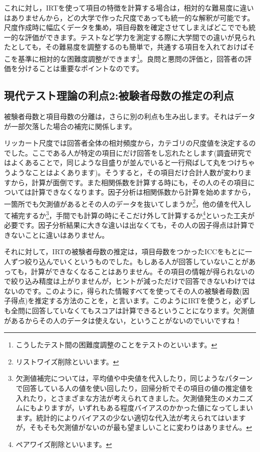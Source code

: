 \documentclass{ltjsbook}
\begin{document}
これに対し，IRTを使って項目の特徴を計算する場合は，相対的な難易度に違いはありませんから，どの大学で作った尺度であっても統一的な解釈が可能です。尺度作成時に幅広くデータを集め，項目母数を確定させてしまえばどこででも統一的な評価ができます。テストなど学力を測定する際に大学間での違いが見られたとしても，その難易度を調整するのも簡単で，共通する項目を入れておけばそこを基準に相対的な困難度調整ができます\footnote{こうしたテスト間の困難度調整のことをテストのといいます。}。良問と悪問の評価と，回答者の評価を分けることは重要なポイントなのです。
\subsection{現代テスト理論の利点2:被験者母数の推定の利点}
被験者母数と項目母数の分離は，さらに別の利点も生み出します。それはデータが一部欠落した場合の補完に関係します。

リッカート尺度では回答者全体の相対頻度から，カテゴリの尺度値を決定するのでした。ここである人が特定の項目にだけ回答をし忘れたとします(調査研究ではよくあることで，同じような目盛りが並んでいると一行飛ばして丸をつけちゃうようなことはよくあります)。そうすると，その項目だけ合計人数が変わりますから，計算が面倒です。また相関係数を計算する時にも，その人のその項目については計算できなくなります。因子分析は相関係数から計算を始めますから，一箇所でも欠測値があるとその人のデータを抜いてしまうか\footnote{リストワイズ削除といいます。}，他の値を代入して補完するか\footnote{欠測値補完については，平均値や中央値を代入したり，同じようなパターンで回答している人の値を使い回したり，回帰分析でその項目の値の推定値を入れたり，とさまざまな方法が考えられてきました。欠測値発生のメカニズムにもよりますが，いずれもある程度バイアスのかかった値になってしまいます。統計的によりバイアスの少ない適切な代入法が考えられてはいますが，そもそも欠測値がないのが最も望ましいことに変わりはありません。}，手間でも計算の時にそこだけ外して計算するか\footnote{ペアワイズ削除といいます。}といった工夫が必要です。因子分析結果に大きな違いは出なくても，その人の因子得点は計算できないことに違いはありません。

それに対して，IRTの被験者母数の推定は，項目母数をつかったICCをもとに一人ずつ絞り込んでいくというものでした。もしある人が回答していないことがあっても，計算ができなくなることはありません。その項目の情報が得られないので絞り込み精度は上がりませんが，ヒントが減っただけで回答できないわけではないのです。このように，得られた情報すべてを使ってその人の被験者母数(因子得点)を推定する方法のことを，と言います。このようにIRTを使うと，必ずしも全問に回答していなくてもスコアは計算できるということになります。欠測値があるからその人のデータは使えない，ということがないのでいいですね！
\end{document}
